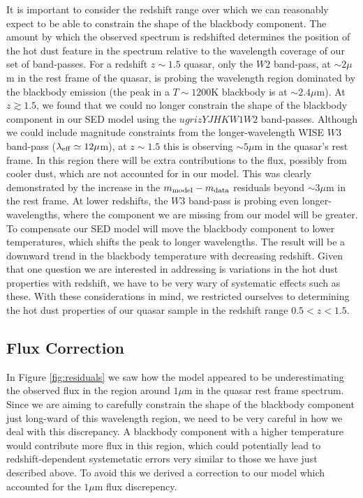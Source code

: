 It is important to consider the redshift range over which we can reasonably expect to be able to constrain the shape of the blackbody component. The amount by which the observed spectrum is redshifted determines the position of the hot dust feature in the spectrum relative to the wavelength coverage of our set of band-passes. For a redshift $z \sim 1.5$ quasar, only the $W2$ band-pass, at $\sim 2 \mu$m in the rest frame of the quasar, is probing the wavelength region dominated by the blackbody emission (the peak in a $T \sim 1200$K blackbody is at $\sim 2.4 \mu$m). At $z \gtrsim 1.5$, we found that we could no longer constrain the shape of the blackbody component in our SED model using the $ugrizYJHKW1W2$ band-passes. Although we could include magnitude constraints from the longer-wavelength WISE $W3$ band-pass ($\lambda_{\rm eff} \simeq 12 \mu$m), at $z \sim 1.5$ this is observing $\sim 5 \mu$m in the quasar's rest frame. In this region there will be extra contributions to the flux, possibly from cooler dust, which are not accounted for in our model. This was clearly demonstrated by the increase in the $m_{\rm model} - m_{\rm data}$ residuals beyond $\sim 3\mu$m in the rest frame. At lower redshifts, the $W3$ band-pass is probing even longer-wavelengths, where the component we are missing from our model will be greater. To compensate our SED model will move the blackbody component to lower temperatures, which shifts the peak to longer wavelengths. The result will be a downward trend in the blackbody temperature with decreasing redshift. Given that one question we are interested in addressing is variations in the hot dust properties with redshift, we have to be very wary of systematic effects such as these. With these considerations in mind, we restricted ourselves to determining the hot dust properties of our quasar sample in the redshift range $0.5 < z < 1.5$. 

\subsection{Flux Correction}
\label{sec:fluxcorrection}

In Figure \ref{fig:residuals} we saw how the model appeared to be underestimating the observed flux in the region around $1 \mu$m in the quasar rest frame spectrum. Since we are aiming to carefully constrain the shape of the blackbody component just long-ward of this wavelength region, we need to be very careful in how we deal with this discrepancy. A blackbody component with a higher temperature would contribute more flux in this region, which could potentially lead to redshift-dependent systemetatic errors very similar to those we have just described above. To avoid this we derived a correction to our model which accounted for the $1 \mu$m flux discrepency. 

